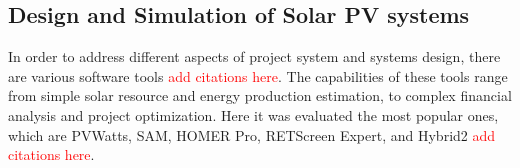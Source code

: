 \documentclass[journal]{IEEEtran}
\begin{document}
\subsection{Design and Simulation of Solar PV systems}
%
In order to address different aspects of project system and systems design, there are various software tools \textcolor{red}{add citations here}. 
The capabilities of these tools range from simple solar resource and energy production estimation, %
 to complex financial analysis and project optimization. 
%
Here it was evaluated the most popular ones, which are PVWatts, SAM, HOMER Pro, RETScreen Expert, and Hybrid2 \textcolor{red}{add citations here}.

\end{document}
